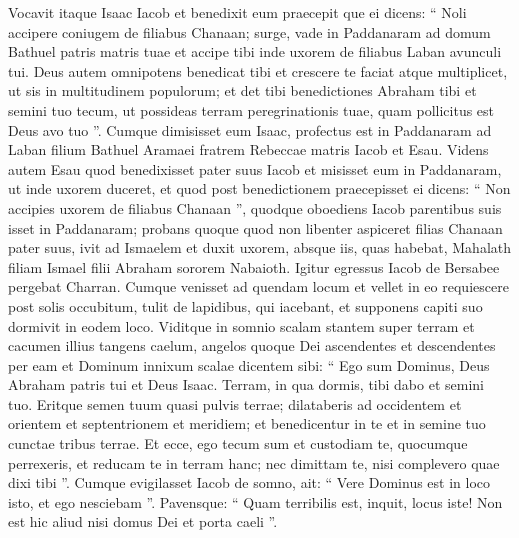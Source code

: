 \begin{biblechapter}
\begin{biblechapter}
\begin{biblechapter}
\begin{biblechapter}
\begin{biblechapter}
\begin{biblechapter}
\begin{biblechapter}
\begin{biblechapter}
\begin{biblechapter}
\begin{biblechapter}
\begin{biblechapter}
\begin{biblechapter}
\begin{biblechapter}
\begin{biblechapter}
\begin{biblechapter}
\begin{biblechapter}
\begin{biblechapter}
\begin{biblechapter}
\begin{biblechapter}
\begin{biblechapter}
\begin{biblechapter}
\begin{biblechapter}
\begin{biblechapter}
\begin{biblechapter}
\begin{biblechapter}
\begin{biblechapter}
\begin{biblechapter}
\begin{biblechapter}
\verse Vocavit itaque Isaac Iacob et benedixit eum praecepit que ei dicens: “ Noli accipere coniugem de filiabus Chanaan; 
\verse surge, vade in Paddanaram ad domum Bathuel patris matris tuae et accipe tibi inde uxorem de filiabus Laban avunculi tui. 
\verse Deus autem omnipotens benedicat tibi et crescere te faciat atque multiplicet, ut sis in multitudinem populorum; 
\verse et det tibi benedictiones Abraham tibi et semini tuo tecum, ut possideas terram peregrinationis tuae, quam pollicitus est Deus avo tuo ”. 
\verse Cumque dimisisset eum Isaac, profectus est in Paddanaram ad Laban filium Bathuel Aramaei fratrem Rebeccae matris Iacob et Esau.
 \verse Videns autem Esau quod benedixisset pater suus Iacob et misisset eum in Paddanaram, ut inde uxorem duceret, et quod post benedictionem praecepisset ei dicens: “ Non accipies uxorem de filiabus Chanaan ”, 
\verse quodque oboediens Iacob parentibus suis isset in Paddanaram; 
\verse probans quoque quod non libenter aspiceret filias Chanaan pater suus, 
\verse ivit ad Ismaelem et duxit uxorem, absque iis, quas habebat, Mahalath filiam Ismael filii Abraham sororem Nabaioth.
 \verse Igitur egressus Iacob de Bersabee pergebat Charran. 
\verse Cumque venisset ad quendam locum et vellet in eo requiescere post solis occubitum, tulit de lapidibus, qui iacebant, et supponens capiti suo dormivit in eodem loco. 
\verse Viditque in somnio scalam stantem super terram et cacumen illius tangens caelum, angelos quoque Dei ascendentes et descendentes per eam 
\verse et Dominum innixum scalae dicentem sibi: “ Ego sum Dominus, Deus Abraham patris tui et Deus Isaac. Terram, in qua dormis, tibi dabo et semini tuo. 
\verse Eritque semen tuum quasi pulvis terrae; dilataberis ad occidentem et orientem et septentrionem et meridiem; et benedicentur in te et in semine tuo cunctae tribus terrae. 
\verse Et ecce, ego tecum sum et custodiam te, quocumque perrexeris, et reducam te in terram hanc; nec dimittam te, nisi complevero quae dixi tibi ”.
 \verse Cumque evigilasset Iacob de somno, ait: “ Vere Dominus est in loco isto, et ego nesciebam ”. 
\verse Pavensque: “ Quam terribilis est, inquit, locus iste! Non est hic aliud nisi domus Dei et porta caeli ”. 

\end{biblechapter}
\end{biblechapter}
\end{biblechapter}
\end{biblechapter}
\end{biblechapter}
\end{biblechapter}
\end{biblechapter}
\end{biblechapter}
\end{biblechapter}
\end{biblechapter}
\end{biblechapter}
\end{biblechapter}
\end{biblechapter}
\end{biblechapter}
\end{biblechapter}
\end{biblechapter}
\end{biblechapter}
\end{biblechapter}
\end{biblechapter}
\end{biblechapter}
\end{biblechapter}
\end{biblechapter}
\end{biblechapter}
\end{biblechapter}
\end{biblechapter}
\end{biblechapter}
\end{biblechapter}
\end{biblechapter}
